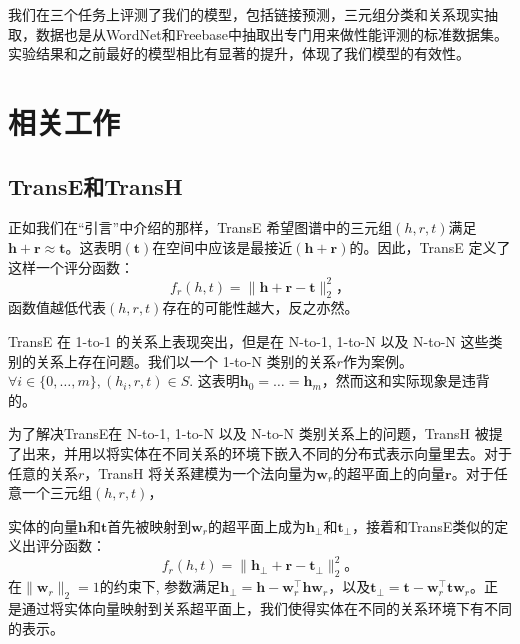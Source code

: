 我们在三个任务上评测了我们的模型，包括链接预测，三元组分类和关系现实抽取，数据也是从WordNet和Freebase中抽取出专门用来做性能评测的标准数据集。实验结果和之前最好的模型相比有显著的提升，体现了我们模型的有效性。

\section{相关工作}

    \subsection{TransE和TransH}

    正如我们在``引言''中介绍的那样，TransE  希望图谱中的三元组$(h, r, t)$满足$\mathbf{h} + \mathbf{r} \approx \mathbf{t}$。这表明$(\mathbf{t})$在空间中应该是最接近$(\mathbf{h} + \mathbf{r})$的。因此，TransE 定义了这样一个评分函数：
    \begin{equation}
    f_{r}(h, t) = \|\mathbf{h} + \mathbf{r} - \mathbf{t}\|_{2}^{2}，
    \end{equation}
    函数值越低代表$(h, r, t)$存在的可能性越大，反之亦然。

    TransE 在 1-to-1 的关系上表现突出，但是在 N-to-1, 1-to-N 以及 N-to-N 这些类别的关系上存在问题。我们以一个 1-to-N 类别的关系$r$作为案例。$\forall i \in \{0, \ldots, m\}, (h_i, r, t) \in S$. 这表明$\mathbf{h}_0 = \ldots = \mathbf{h}_m$，然而这和实际现象是违背的。

    为了解决TransE在 N-to-1, 1-to-N 以及 N-to-N 类别关系上的问题，TransH  被提了出来，并用以将实体在不同关系的环境下嵌入不同的分布式表示向量里去。对于任意的关系$r$，TransH 将关系建模为一个法向量为$\mathbf{w}_r$的超平面上的向量$\mathbf{r}$。对于任意一个三元组$(h, r, t)$，



    实体的向量$\mathbf{h}$和$\mathbf{t}$首先被映射到$\mathbf{w}_r$的超平面上成为$\mathbf{h}_{\bot}$和$\mathbf{t}_{\bot}$，接着和TransE类似的定义出评分函数：
    \begin{equation}
    f_{r}(h, t) = \|\mathbf{h}_{\bot} + \mathbf{r} - \mathbf{t}_{\bot}\|_{2}^{2}。
    \end{equation}
    在$\|\mathbf{w}_r\|_{2} = 1$的约束下, 参数满足$\mathbf{h}_{\bot} = \mathbf{h} - \mathbf{w}_{r}^{\top}\mathbf{h}\mathbf{w}_{r}$，以及$\mathbf{t}_{\bot} = \mathbf{t} - \mathbf{w}_{r}^{\top}\mathbf{t}\mathbf{w}_{r}$。正是通过将实体向量映射到关系超平面上，我们使得实体在不同的关系环境下有不同的表示。


